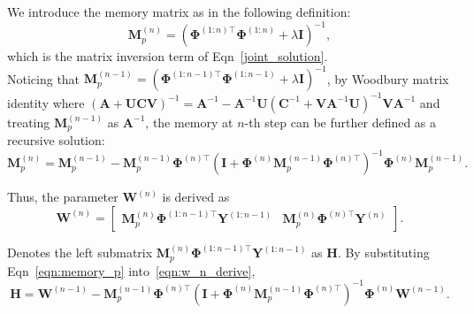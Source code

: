 We introduce the memory matrix as in the following definition:
\begin{equation}
    \label{eqn:M_p}
    \mathbf{M}_p^{\left(n\right)} = 
    \left(\mathbf{\Phi}^{\left(1:n\right) \top} \mathbf{\Phi}^{\left(1:n\right)} + \lambda \mathbf{I}\right)^{-1},
\end{equation}
which is the matrix inversion term of Eqn~\ref{joint_solution}. \\
Noticing that $\mathbf{M}_p^{\left(n-1\right)} = \left({\mathbf{\Phi}^{\left(1:n-1\right)\top}}      
{\mathbf{\Phi}^{\left(1:n-1\right)}}  
+ \lambda \mathbf{I}\right)^{-1}$, 
by Woodbury matrix identity where  $\left(\mathbf{A} + \mathbf{UCV}\right)^{-1} = \mathbf{A}^{-1} - \mathbf{A}^{-1} \mathbf{U} \left(\mathbf{C}^{-1} + \mathbf{V} \mathbf{A}^{-1} \mathbf{U}\right)^{-1} \mathbf{V} \mathbf{A}^{-1}$ and treating $\mathbf{M}_p^{\left(n-1\right)}$ as $\mathbf{A}^{-1}$, the memory at $n$-th step can be further defined as a recursive solution:
\begin{equation}
\label{eqn:memory_p}
\mathbf{M}_p^{\left(n\right)} =
 \mathbf{M}_p^{\left(n-1\right)} - \mathbf{M}_p^{\left(n-1\right)} \mathbf{\Phi}^{\left(n\right)\top} \left(\mathbf{I} + \mathbf{\Phi}^{\left(n\right)} \mathbf{M}_p^{\left(n-1\right)} \mathbf{\Phi}^{\left(n\right)\top}\right)^{-1} \mathbf{\Phi}^{\left(n\right)} \mathbf{M}_p^{\left(n-1\right)}.
\end{equation}

Thus, the parameter $\mathbf{W}^{\left(n\right)}$ is derived as
\begin{equation}
\label{eqn:w_n_derive}
    \mathbf{W}^{\left(n\right)} = 
    \begin{bmatrix}
    \mathbf{M}_p^{\left(n\right)} {\mathbf{\Phi}^{\left(1:n-1\right)\top}} \mathbf{Y}^{\left(1:n-1\right)} &
    \mathbf{M}_p^{\left(n\right)} {\mathbf{\Phi}^{\left(n\right)\top}} \mathbf{Y}^{\left(n\right)}
    \end{bmatrix}.
\end{equation}

Denotes the left submatrix $\mathbf{M}_p^{(n)} \mathbf{\Phi}^{(1:n-1)\top} \mathbf{Y}^{(1:n-1)}$ as $\mathbf{H}$. By substituting Eqn~\ref{eqn:memory_p} into~\ref{eqn:w_n_derive},
\begin{equation}
    \mathbf{H} = 
    \mathbf{W}^{\left(n-1\right)} - \mathbf{M}_p^{(n-1)} \mathbf{\Phi}^{(n)\top} \left(\mathbf{I} + \mathbf{\Phi}^{(n)} \mathbf{M}_p^{(n-1)} \mathbf{\Phi}^{(n)\top}\right)^{-1}
   \mathbf{\Phi}^{(n)} \mathbf{W}^{\left(n-1\right)}.
\end{equation}
     
